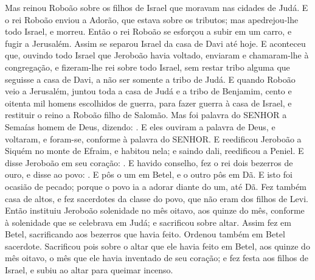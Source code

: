 {  Mas reinou Roboão sobre os filhos de Israel que moravam nas cidades de Judá.
  E o rei Roboão enviou a Adorão, que estava sobre os tributos; mas apedrejou-lhe todo Israel, e morreu. Então o rei Roboão se esforçou a subir em um carro, e fugir a Jerusalém.
  Assim se separou Israel da casa de Davi até hoje.
  E aconteceu que, ouvindo todo Israel que Jeroboão havia voltado, enviaram e chamaram-lhe à congregação, e fizeram-lhe rei sobre todo Israel, sem restar tribo alguma que seguisse a casa de Davi, a não ser somente a tribo de Judá.
  E quando Roboão veio a Jerusalém, juntou toda a casa de Judá e a tribo de Benjamim, cento e oitenta mil homens escolhidos de guerra, para fazer guerra à casa de Israel, e restituir o reino a Roboão filho de Salomão.
  Mas foi palavra do SENHOR a Semaías homem de Deus, dizendo:
  . E eles ouviram a palavra de Deus, e voltaram, e foram-se, conforme à palavra do SENHOR.
  E reedificou Jeroboão a Siquém no monte de Efraim, e habitou nela; e saindo dali, reedificou a Peniel.
  E disse Jeroboão em seu coração: .
  E havido conselho, fez o rei dois bezerros de ouro, e disse ao povo: .
  E pôs o um em Betel, e o outro pôs em Dã.
  E isto foi ocasião de pecado; porque o povo ia a adorar diante do um, até Dã.
  Fez também casa de altos, e fez sacerdotes da classe do povo, que não eram dos filhos de Levi.
  Então instituiu Jeroboão solenidade no mês oitavo, aos quinze do mês, conforme à solenidade que se celebrava em Judá; e sacrificou sobre altar. Assim fez em Betel, sacrificando aos bezerros que havia feito. Ordenou também em Betel sacerdote.
  Sacrificou pois sobre o altar que ele havia feito em Betel, aos quinze do mês oitavo, o mês que ele havia inventado de seu coração; e fez festa aos filhos de Israel, e subiu ao altar para queimar incenso.
\par }

